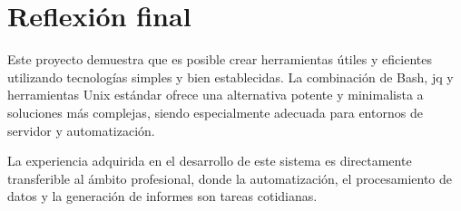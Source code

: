 \section{Reflexión final}

Este proyecto demuestra que es posible crear herramientas útiles y eficientes utilizando tecnologías simples y bien establecidas. La combinación de Bash, jq y herramientas Unix estándar ofrece una alternativa potente y minimalista a soluciones más complejas, siendo especialmente adecuada para entornos de servidor y automatización.

La experiencia adquirida en el desarrollo de este sistema es directamente transferible al ámbito profesional, donde la automatización, el procesamiento de datos y la generación de informes son tareas cotidianas.
